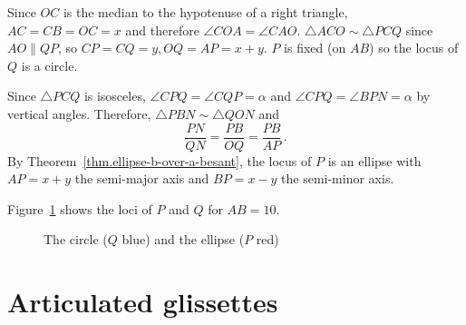 Since $OC$ is the median to the hypotenuse of a right triangle, $AC=CB=OC=x$  and therefore $\angle COA=\angle CAO$. $\triangle ACO\sim \triangle PCQ$ since $AO\parallel QP$, so $CP=CQ=y, OQ=AP=x+y$. $P$ is fixed (on $AB$) so the locus of $Q$ is a circle.

Since $\triangle PCQ$ is isosceles, $\angle CPQ=\angle CQP=\alpha$ and $\angle CPQ=\angle BPN=\alpha$ by vertical angles. Therefore, $\triangle PBN\sim \triangle QON$ and
\[
\frac{PN}{QN}=\frac{PB}{OQ}=\frac{PB}{AP}\,.
\]
By Theorem~\ref{thm.ellipse-b-over-a-besant}, the locus of $P$ is an ellipse with $AP=x+y$ the semi-major axis and $BP=x-y$ the semi-minor axis.

Figure~\ref{f.glissette2} shows the loci of $P$ and $Q$ for $AB=10$.


\begin{figure}[t]
\begin{center}
\caption{The circle ($Q$ blue) and the ellipse ($P$ red)}\label{f.glissette2}
\end{center}
\end{figure}

\newpage
\section{Articulated glissettes}\label{s.articulated}

